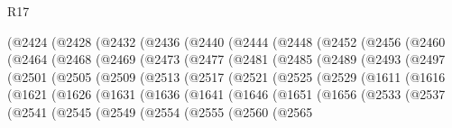 \begin{lexlean}{R17}
\begin{coremodule}
{{{{{{{{{{{{{{{{{{{{{{{{{{{{{{{{{{{{{{{{{{{{{{{{{{{{{{{{{{{{{{{{{{{{{{{{{{{{{{{{{{{{{{{{{{{{{{{{{{{{{{{{{{{    (@2424
      (@2428
        (@2432
          (@2436
            (@2440
              (@2444
                (@2448
                  (@2452
                    (@2456
                      (@2460
                        (@2464
                          (@2468
                            (@2469
                              (@2473
                                (@2477
                                  (@2481
                                    (@2485
                                      (@2489
                                        (@2493
                                          (@2497
                                            (@2501
                                              (@2505
                                                (@2509
                                                  (@2513
                                                    (@2517
                                                      (@2521
                                                        (@2525
                                                          (@2529
                                                            (@1611
                                                              (@1616
                                                                (@1621
                                                                  (@1626
                                                                    (@1631
                                                                      (@1636
                                                                        (@1641
                                                                          (@1646
                                                                            (@1651
                                                                              (@1656
                                                                                (@2533
                                                                                  (@2537
                                                                                    (@2541
                                                                                      (@2545
                                                                                        (@2549
                                                                                          (@2554
                                                                                            (@2555
                                                                                              (@2560
                                                                                                (@2565
}}}}}}}}}}}}}}}}}}}}}}}}}}}}}}}}}}}}}}}}}}}}}}}}}}}}}}}}}}}}}}}}}}}}}}}}}}}}}}}}}}}}}}}}}}}}}}}}}}}}}}}}}}}
\end{coremodule}
\end{lexlean}
